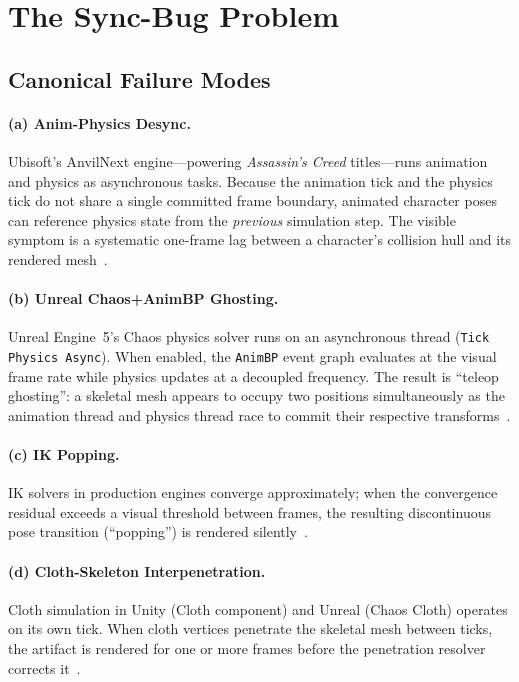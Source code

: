 \documentclass[sigconf,nonacm]{acmart}
\begin{document}
\section{The Sync-Bug Problem}
\label{sec:problem}

\subsection{Canonical Failure Modes}
\paragraph{(a) Anim-Physics Desync.}
Ubisoft's AnvilNext engine---powering \emph{Assassin's Creed}
titles---runs animation and physics as asynchronous tasks.
Because the animation tick and the physics tick do not share a
single committed frame boundary, animated character poses can
reference physics state from the \emph{previous} simulation
step. The visible symptom is a systematic one-frame lag between
a character's collision hull and its rendered
mesh~\cite{anvilnext-anim-arch}.

\paragraph{(b) Unreal Chaos+AnimBP Ghosting.}
Unreal Engine~5's Chaos physics solver runs on an asynchronous
thread (\texttt{Tick Physics Async}). When enabled, the
\texttt{AnimBP} event graph evaluates at the visual frame rate
while physics updates at a decoupled frequency. The result is
``teleop ghosting'': a skeletal mesh appears to occupy two
positions simultaneously as the animation thread and physics
thread race to commit their respective
transforms~\cite{ue5-chaos-async,ue5-forum-physanim}.

\paragraph{(c) IK Popping.}
IK solvers in production engines converge approximately; when the convergence residual exceeds a visual threshold between frames, the resulting discontinuous pose transition (``popping'') is rendered silently~\cite{aristidou-fabrik, unity-anim-rigging}.

\paragraph{(d) Cloth-Skeleton Interpenetration.}
Cloth simulation in Unity (Cloth component) and Unreal (Chaos Cloth) operates on its own tick. When cloth vertices penetrate the skeletal mesh between ticks, the artifact is rendered for one or more frames before the penetration resolver corrects it~\cite{muller-pbd2007, nvidia-nvcloth}.
\end{document}
